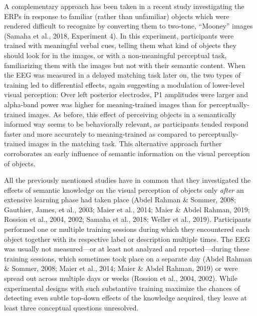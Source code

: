 \documentclass[
  english,
  doc,12pt,twoside,floatsintext]{apa7}
\begin{document}
A complementary approach has been taken in a recent study investigating the ERPs in response to familiar (rather than unfamiliar) objects which were rendered difficult to recognize by converting them to two-tone, ``Mooney'' images (Samaha et al., 2018, Experiment 4). In this experiment, participants were trained with meaningful verbal cues, telling them what kind of objects they should look for in the images, or with a non-meaningful perceptual task, familiarizing them with the images but not with their semantic content. When the EEG was measured in a delayed matching task later on, the two types of training led to differential effects, again suggesting a modulation of lower-level visual perception: Over left posterior electrodes, P1 amplitudes were larger and alpha-band power was higher for meaning-trained images than for perceptually-trained images. As before, this effect of perceiving objects in a semantically informed way seems to be behaviorally relevant, as participants tended respond faster and more accurately to meaning-trained as compared to perceptually-trained images in the matching task. This alternative approach further corroborates an early influence of semantic information on the visual perception of objects.

All the previously mentioned studies have in common that they investigated the effects of semantic knowledge on the visual perception of objects only \emph{after} an extensive learning phase had taken place (Abdel Rahman \& Sommer, 2008; Gauthier, James, et al., 2003; Maier et al., 2014; Maier \& Abdel Rahman, 2019; Rossion et al., 2004, 2002; Samaha et al., 2018; Weller et al., 2019). Participants performed one or multiple training sessions during which they encountered each object together with its respective label or description multiple times. The EEG was usually not measured---or at least not analyzed and reported---during these training sessions, which sometimes took place on a separate day (Abdel Rahman \& Sommer, 2008; Maier et al., 2014; Maier \& Abdel Rahman, 2019) or were spread out across multiple days or weeks (Rossion et al., 2004, 2002). While experimental designs with such substantive training maximize the chances of detecting even subtle top-down effects of the knowledge acquired, they leave at least three conceptual questions unresolved.
\end{document}
